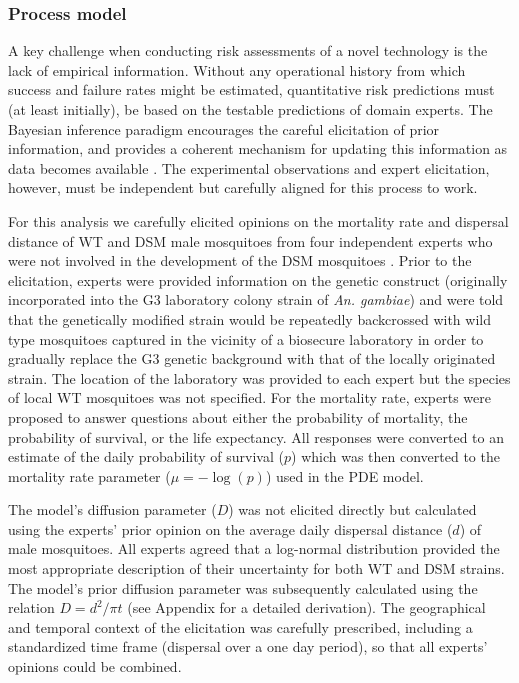 \documentclass[]{bmcart}
\newcommand{\vd}{{D}}
\begin{document}
\subsubsection{Process model}
A key challenge when conducting risk assessments of a novel technology is the lack of empirical information. Without any operational history from which success and failure rates might be estimated, quantitative risk predictions must (at least initially), be based on the testable predictions of domain experts. The Bayesian inference paradigm encourages the careful elicitation of prior information, and provides a coherent mechanism for updating this information as data becomes available \citep{Lindley2000}. The experimental observations and expert elicitation, however, must be independent but carefully aligned for this process to work.

For this analysis we carefully elicited opinions on the mortality rate and dispersal distance of WT and DSM male mosquitoes from four independent experts who were not involved in the development of the DSM mosquitoes \cite{Hayes2015a}. Prior to the elicitation, experts were provided information on the genetic construct (originally incorporated into the G3 laboratory colony strain of \textit{An. gambiae}) and were told that the genetically modified strain would be repeatedly backcrossed with wild type mosquitoes captured in the vicinity of a biosecure laboratory in order to gradually replace the G3 genetic background with that of the locally originated strain. The location of the laboratory was provided to each expert but the species of local WT mosquitoes was not specified. For the mortality rate, experts were proposed to answer questions about either the probability of mortality, the probability of survival, or the life expectancy. All responses were converted to an estimate of the daily probability of survival ($p$) which was then converted to the mortality rate parameter ($\mu = -\log(p)$) used in the PDE model.

The model's diffusion parameter ($\vd$) was not elicited directly but calculated using the experts' prior opinion on the average daily dispersal distance ($d$) of male mosquitoes. All experts agreed that a log-normal distribution provided the most appropriate description of their uncertainty for both WT and DSM strains. The model's prior diffusion parameter was subsequently calculated using the relation $\vd = d^2/\pi t$ (see Appendix for a detailed derivation). The geographical and temporal context of the elicitation was carefully prescribed, including a standardized time frame (dispersal over a one day period), so that all experts' opinions could be combined.
\end{document}
